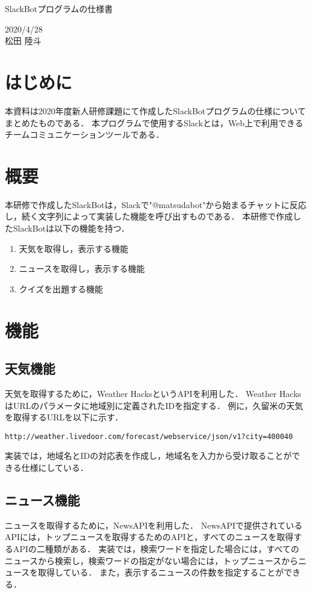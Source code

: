 \documentclass[12pt]{jsarticle}
\begin{document}
\begin{center}
{\LARGE SlackBotプログラムの仕様書}
\end{center}

\begin{flushright}
  2020/4/28\\
  松田 陸斗
\end{flushright}
\section{はじめに}
\label{sec:introduction}
本資料は2020年度新人研修課題にて作成したSlackBotプログラムの仕様についてまとめたものである．
本プログラムで使用するSlackとは，Web上で利用できるチームコミュニケーションツールである．

\section{概要}
本研修で作成したSlackBotは，Slackで"@matsudabot"から始まるチャットに反応し，続く文字列によって実装した機能を呼び出すものである．
本研修で作成したSlackBotは以下の機能を持つ．
\begin{enumerate}
\item 天気を取得し，表示する機能
\item ニュースを取得し，表示する機能
\item クイズを出題する機能
\end{enumerate}


\section{機能}
\subsection{天気機能}
天気を取得するために，Weather HacksというAPIを利用した．
Weather HacksはURLのパラメータに地域別に定義されたIDを指定する．
例に，久留米の天気を取得するURLを以下に示す．
\begin{verbatim}
http://weather.livedoor.com/forecast/webservice/json/v1?city=400040
\end{verbatim}
実装では，地域名とIDの対応表を作成し，地域名を入力から受け取ることができる仕様にしている．
\subsection{ニュース機能}
ニュースを取得するために，NewsAPIを利用した．
NewsAPIで提供されているAPIには，トップニュースを取得するためのAPIと，すべてのニュースを取得するAPIの二種類がある．
実装では，検索ワードを指定した場合には，すべてのニュースから検索し，検索ワードの指定がない場合には，トップニュースからニュースを取得している．
また，表示するニュースの件数を指定することができる．
\end{document}
